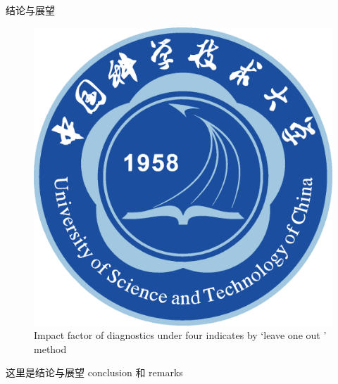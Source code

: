 \documentclass[8pt,compress,t,notheorems,noamsthm,notheorem,xcolor=x11names]{beamer}
\theoremstyle{nonumberplain}%
\theoremstyle{plain}
\begin{document}
\begin{frame}{结论与展望}
	\begin{figure}[htbp]
	\centering
	\includegraphics[scale=0.1]{ustc_logo_fig_new}
	\caption{Impact factor of diagnostics under four indicates by `leave one out ' method}
	\label{fig1}
	\end{figure}
  这里是结论与展望 conclusion 和 remarks

\end{frame}



\end{document}
